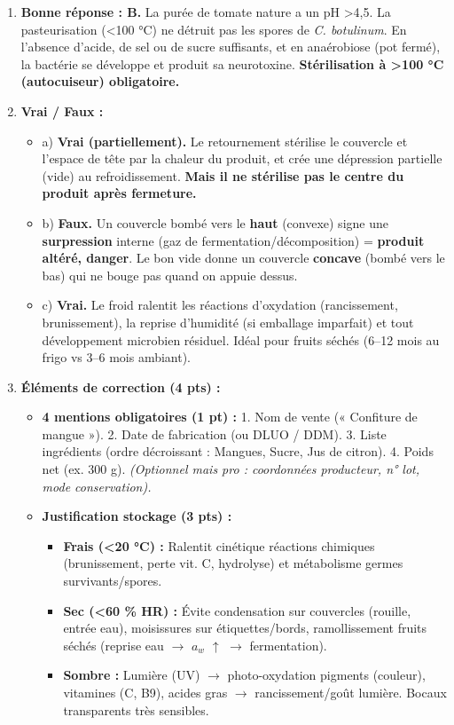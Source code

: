 \documentclass[11pt]{article}
\begin{document}
\begin{corrige}[Exercice n°1]
\begin{enumerate}
    \item \textbf{Bonne réponse : B.} La purée de tomate nature a un pH \textgreater 4,5. La pasteurisation (\textless 100 °C) ne détruit pas les spores de \emph{C. botulinum}. En l'absence d'acide, de sel ou de sucre suffisants, et en anaérobiose (pot fermé), la bactérie se développe et produit sa neurotoxine. \textbf{Stérilisation à \textgreater 100 °C (autocuiseur) obligatoire.}
    \item \textbf{Vrai / Faux :}
    \begin{itemize}
        \item a) \textbf{Vrai (partiellement).} Le retournement stérilise le couvercle et l'espace de tête par la chaleur du produit, et crée une dépression partielle (vide) au refroidissement. \textbf{Mais il ne stérilise pas le centre du produit après fermeture.}
        \item b) \textbf{Faux.} Un couvercle bombé vers le \textbf{haut} (convexe) signe une \textbf{surpression} interne (gaz de fermentation/décomposition) = \textbf{produit altéré, danger}. Le bon vide donne un couvercle \textbf{concave} (bombé vers le bas) qui ne bouge pas quand on appuie dessus.
        \item c) \textbf{Vrai.} Le froid ralentit les réactions d'oxydation (rancissement, brunissement), la reprise d'humidité (si emballage imparfait) et tout développement microbien résiduel. Idéal pour fruits séchés (6--12 mois au frigo vs 3--6 mois ambiant).
    \end{itemize}
    \item \textbf{Éléments de correction (4 pts) :}
    \begin{itemize}
        \item \textbf{4 mentions obligatoires (1 pt) :} 1. Nom de vente (« Confiture de mangue »). 2. Date de fabrication (ou DLUO / DDM). 3. Liste ingrédients (ordre décroissant : Mangues, Sucre, Jus de citron). 4. Poids net (ex. 300 g). \textit{(Optionnel mais pro : coordonnées producteur, n° lot, mode conservation).}
        \item \textbf{Justification stockage (3 pts) :}
        \begin{itemize}
            \item \textbf{Frais (\textless 20 °C) :} Ralentit cinétique réactions chimiques (brunissement, perte vit. C, hydrolyse) et métabolisme germes survivants/spores.
            \item \textbf{Sec (\textless 60 \% HR) :} Évite condensation sur couvercles (rouille, entrée eau), moisissures sur étiquettes/bords, ramollissement fruits séchés (reprise eau $\rightarrow$ $a_w$ $\uparrow$ $\rightarrow$ fermentation).
            \item \textbf{Sombre :} Lumière (UV) $\rightarrow$ photo-oxydation pigments (couleur), vitamines (C, B9), acides gras $\rightarrow$ rancissement/goût lumière. Bocaux transparents très sensibles.
        \end{itemize}
    \end{itemize}
\end{enumerate}
\end{corrige}
\end{document}
